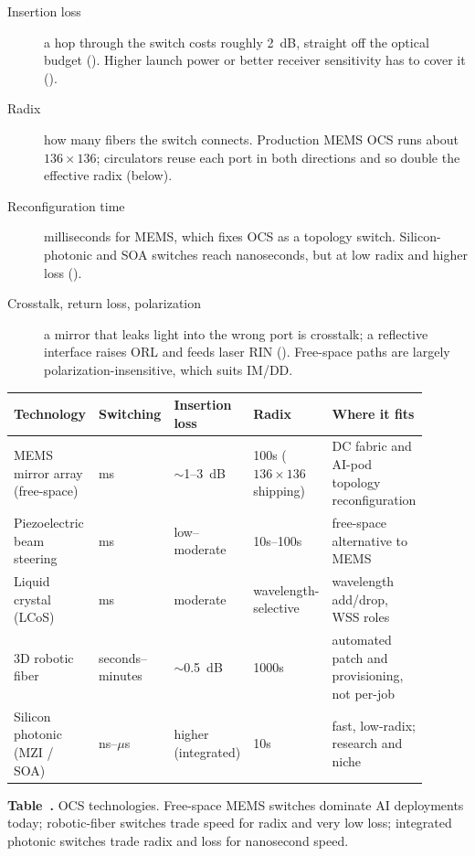 \begin{description}
\item[Insertion loss] a hop through the switch costs roughly 2~dB, straight off the
      optical budget (). Higher launch power or better receiver
      sensitivity has to cover it ().
\item[Radix] how many fibers the switch connects. Production MEMS OCS runs about
      $136\times136$; circulators reuse each port in both directions and so double the
      effective radix (below).
\item[Reconfiguration time] milliseconds for MEMS, which fixes OCS as a topology switch.
      Silicon-photonic and SOA switches reach nanoseconds, but at low radix and higher
      loss ().
\item[Crosstalk, return loss, polarization] a mirror that leaks light into the wrong
      port is crosstalk; a reflective interface raises ORL and feeds laser RIN
      (). Free-space paths are largely
      polarization-insensitive, which suits IM/DD.
\end{description}

\begin{table}[ht]
\label{tab:ocs-tech}%
\centering
\setlength{\tabcolsep}{4pt}%
\footnotesize
\renewcommand{\arraystretch}{1.25}%
\begin{tabular}{@{}p{0.22\linewidth}p{0.16\linewidth}p{0.15\linewidth}p{0.13\linewidth}p{0.24\linewidth}@{}}
\toprule
Technology & Switching & Insertion loss & Radix & Where it fits \\
\midrule
MEMS mirror array (free-space) & ms & $\sim$1--3~dB & 100s ($136\times136$ shipping) & DC fabric and AI-pod topology reconfiguration \\
\addlinespace[1.5em]
Piezoelectric beam steering & ms & low--moderate & 10s--100s & free-space alternative to MEMS \\
\addlinespace[1.5em]
Liquid crystal (LCoS) & ms & moderate & wavelength-selective & wavelength add/drop, WSS roles \\
\addlinespace[1.5em]
3D robotic fiber & seconds--minutes & $\sim$0.5~dB & 1000s & automated patch and provisioning, not per-job \\
\addlinespace[1.5em]
Silicon photonic (MZI / SOA) & ns--$\mu$s & higher (integrated) & 10s & fast, low-radix; research and niche \\
\bottomrule
\end{tabular}
\par\medskip
{\raggedright\footnotesize\textbf{Table~\thetable.} OCS technologies. Free-space MEMS
switches dominate AI deployments today; robotic-fiber switches trade speed for radix and
very low loss; integrated photonic switches trade radix and loss for nanosecond
speed.\par}
\end{table}

